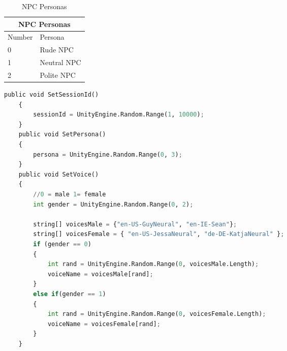 \begin{table}[!ht]
    \centering
\begin{tabular}{ |p{3cm}|p{5cm}|  }
\hline
\multicolumn{2}{|c|}{NPC Personas} \\
\hline
Number & Persona \\
\hline
0 & Rude NPC \\
\hline
1 & Neutral NPC \\
\hline
2 & Polite NPC \\
\hline
\end{tabular}

    \caption{NPC Personas \newline}
    \label{tab:my_label}
\end{table}
\newpage

\begin{lstlisting}[caption={Random NPC persona generation.},label={lst:npcs}, language=python]
    public void SetSessionId()
    {
        sessionId = UnityEngine.Random.Range(1, 10000);
    }
    public void SetPersona()
    {
        persona = UnityEngine.Random.Range(0, 3);
    }
    public void SetVoice()
    {
        //0 = male 1= female
        int gender = UnityEngine.Random.Range(0, 2);
        
        string[] voicesMale = {"en-US-GuyNeural", "en-IE-Sean"};
        string[] voicesFemale = { "en-US-JessaNeural", "de-DE-KatjaNeural" };
        if (gender == 0)
        {
            int rand = UnityEngine.Random.Range(0, voicesMale.Length);
            voiceName = voicesMale[rand];
        }
        else if(gender == 1)
        {
            int rand = UnityEngine.Random.Range(0, voicesFemale.Length);
            voiceName = voicesFemale[rand];
        }
    }
\end{lstlisting}

